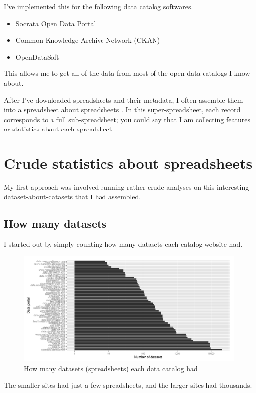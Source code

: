 \documentclass{acm_proc_article-sp}
\begin{document}
I've implemented this for the following data catalog softwares.

\begin{itemize}
\item Socrata Open Data Portal
\item Common Knowledge Archive Network (CKAN)
\item OpenDataSoft
\end{itemize}

This allows me to get all of the data from most of the open data catalogs I know about.

After I've downloaded spreadsheets and their metadata,
I often assemble them into a spreadsheet about spreadsheets \cite{data-driven}.
In this super-spreadsheet, each record corresponds to a full
sub-spreadsheet; you could say that I am collecting features or statistics
about each spreadsheet.

\section{Crude statistics about spreadsheets}
My first approach was involved running rather crude analyses on this
interesting dataset-about-datasets that I had assembled.

\subsection{How many datasets}
I started out by simply counting how many datasets each catalog website had.

\begin{figure}
\includegraphics[width=\columnwidth]{../socrata-summary/figure/big_portals_datasets.png}
\caption{How many datasets (spreadsheets) each data catalog had}
\centering
\end{figure}

The smaller sites had just a few spreadsheets, and the larger sites had thousands.
\end{document}
